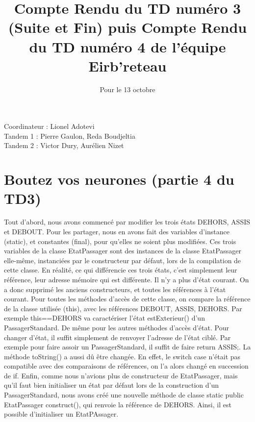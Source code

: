 \documentclass[a4paper,11pt]{article}
\begin{document}
\title{Compte Rendu du TD numéro 3 (Suite et Fin) puis Compte Rendu du TD numéro 4 de l'équipe Eirb'reteau}
\date{Pour le 13 octobre}
\maketitle

\begin{center}
  Coordinateur :  Lionel Adotevi \\
  Tandem 1 : Pierre Gaulon, Reda Boudjeltia \\
  Tandem 2 : Victor Dury,  Aurélien Nizet \\
\end{center}
\maketitle

\section*{Boutez vos neurones (partie 4 du TD3)}
Tout d'abord, nous avons commencé par modifier les trois états DEHORS, ASSIS et DEBOUT. Pour les partager, nous en avons fait des variables d'instance (static), et constantes (final), pour qu'elles ne soient plus modifiées. Ces trois variables de la classe EtatPassager sont des instances de la classe EtatPassager elle-même, instanciées par le constructeur par défaut, lors de la compilation de cette classe. En réalité, ce qui différencie ces trois états, c'est simplement leur référence, leur adresse mémoire qui est différente. Il n'y a plus d'état courant. On a donc supprimé les anciens constructeurs, et toutes les références à l'état courant. Pour toutes les méthodes d'accès de cette classe, on compare la référence de la classe utilisée (this), avec les références DEBOUT, ASSIS, DEHORS. Par exemple this==DEHORS va caractériser l'état estExterieur() d'un PassagerStandard. De même pour les autres méthodes d'accès d'état. Pour changer d'état, il suffit simplement de renvoyer l'adresse de l'état ciblé. Par exemple pour faire assoir un PassagerStandard, il suffit de faire return ASSIS;. La méthode toString() a aussi dû être changée. En effet, le switch case n'était pas compatible avec des comparaisons de références, on l'a alors changé en succession de if. Enfin, comme nous n'avions plus de constructeur de EtatPassager, mais qu'il faut bien initialiser un état par défaut lors de la construction d'un PassagerStandard, nous avons créé une nouvelle méthode de classe static public EtatPassager construct(), qui renvoie la référence de DEHORS. Ainsi, il est possible d'initialiser un EtatPAssager.
\end{document}
